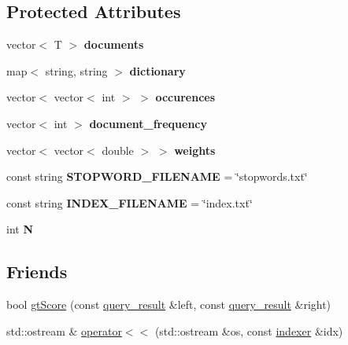 \subsection*{Protected Attributes}
\begin{DoxyCompactItemize}
\item 
\mbox{\label{classindexer_a6abed0fea36154b71519907b05b885d0}} 
vector$<$ T $>$ {\bfseries documents}
\item 
\mbox{\label{classindexer_a03f158c72c7621d8dab90c4cd9cf431a}} 
map$<$ string, string $>$ {\bfseries dictionary}
\item 
\mbox{\label{classindexer_a2cbad9f7f78300bf5649daa32078e12a}} 
vector$<$ vector$<$ int $>$ $>$ {\bfseries occurences}
\item 
\mbox{\label{classindexer_afb80e871ebc8c9f1be767d54a95a23fd}} 
vector$<$ int $>$ {\bfseries document\+\_\+frequency}
\item 
\mbox{\label{classindexer_ade3c3d24f62651a7912bd85e0edc4706}} 
vector$<$ vector$<$ double $>$ $>$ {\bfseries weights}
\item 
\mbox{\label{classindexer_adb33cc63971f5b772490f1aff423a459}} 
const string {\bfseries S\+T\+O\+P\+W\+O\+R\+D\+\_\+\+F\+I\+L\+E\+N\+A\+ME} = \char`\"{}stopwords.\+txt\char`\"{}
\item 
\mbox{\label{classindexer_ad8a40eccbf9d7d95776d17b8a196d22f}} 
const string {\bfseries I\+N\+D\+E\+X\+\_\+\+F\+I\+L\+E\+N\+A\+ME} = \char`\"{}index.\+txt\char`\"{}
\item 
\mbox{\label{classindexer_a8b397b2fe07c594efb920f11da8e463c}} 
int {\bfseries N}
\end{DoxyCompactItemize}
\subsection*{Friends}
\begin{DoxyCompactItemize}
\item 
bool \hyperlink{classindexer_af90a86217251694caa9471be14515ee9}{gt\+Score} (const \hyperlink{classquery__result}{query\+\_\+result} \&left, const \hyperlink{classquery__result}{query\+\_\+result} \&right)
\item 
std\+::ostream \& \hyperlink{classindexer_afbe836c0f0a47dc1393416275175fadb}{operator$<$$<$} (std\+::ostream \&os, const \hyperlink{classindexer}{indexer} \&idx)
\end{DoxyCompactItemize}


